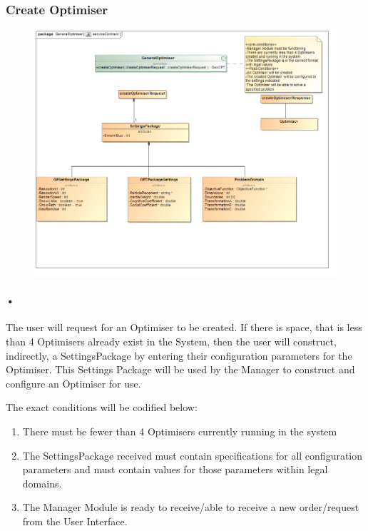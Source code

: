 \documentclass[11pt]{article}
\begin{document}
\subsubsection{Create Optimiser}
\begin{figure}[H]
\includegraphics[scale=0.4]{serviceContractOPT.png}
\end{figure}

\paragraph{•}
The user will request for an Optimiser to be created. If there is space, that is less than 4 Optimisers already exist in the System, then the user will construct, indirectly, a SettingsPackage by entering their configuration parameters for the Optimiser. This Settings Package will be used by the Manager to construct and configure an Optimiser for use.

The exact conditions will be codified below:
\begin{enumerate}
\item There must be fewer than 4 Optimisers currently running in the system
\item The SettingsPackage received must contain specifications for all configuration parameters and must contain values for those parameters within legal domains.
\item The Manager Module is ready to receive/able to receive a new order/request from the User Interface.
\end{enumerate}
\end{document}
